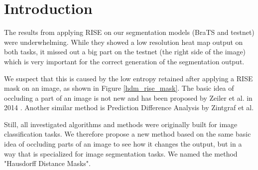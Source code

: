 \section{Introduction}

The results from applying RISE on our segmentation models (BraTS and testnet) were underwhelming. While they showed a low resolution heat map output on both tasks, it missed out a big part on the testnet (the right side of the image) which is very important for the correct generation of the segmentation output.

We suspect that this is caused by the low entropy retained after applying a RISE mask on an image, as shown in Figure \ref{hdm_rise_mask}.
The basic idea of occluding a part of an image is not new and has been proposed by Zeiler et al. in 2014 \cite{zeiler2014visualizing}.
Another similar method is Prediction Difference Analysis \cite{zintgraf2017visualizing} by Zintgraf et al.

Still, all investigated algorithms and methods were originally built for image classification tasks. We therefore propose a new method based on the same basic idea
of occluding parts of an image to see how it changes the output, but in a way that is specialized for image segmentation tasks. We named the method "Hausdorff Distance Masks".


